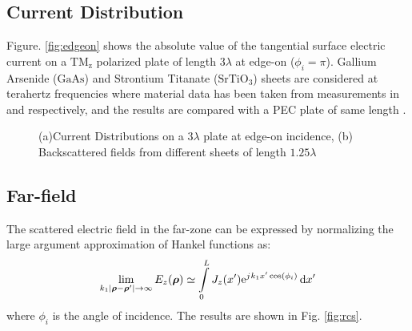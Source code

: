 \documentclass[12pt]{article}
\begin{document}
\subsection{Current Distribution}
%
Figure. \ref{fig:edgeon} shows the absolute value of the tangential surface electric current on a $\mathrm{TM_z}$ polarized plate of length $3 \lambda$ at edge-on ($\phi_i = \pi$). Gallium Arsenide ($\mathrm{GaAs}$) and Strontium Titanate ($\mathrm{SrTiO_3}$) sheets are considered at terahertz frequencies where material data has been taken from measurements in \cite{burke2000} and \cite{herranz2012high} respectively, and the results are compared with a PEC plate of same length \cite{senior1979backscattering}.
%
\begin{figure}[!htbp]
  \centering
  \caption{(a)Current Distributions on a $3\lambda$ plate at edge-on incidence, (b) Backscattered fields from different sheets of length $1.25\lambda$}
  \label{fig:Electric_properties_2DEG}
\end{figure}
%
\subsection{Far-field}
%
The scattered electric field in the far-zone can be expressed by normalizing the large argument approximation of Hankel functions as:
%
\begin{equation}
  \lim_{k_1|\boldsymbol {\rho} - \boldsymbol {\rho}'|\to\infty} E_z(\boldsymbol {\rho}) \simeq \int \limits_{0}^{L} J_z(x') \mathrm{e}^{{j}\mkern1mu k_1 x' \cos(\phi_i)} \mathop{}\!\mathrm{d}{x'}
  \label{eq:far-field}
\end{equation}
%
where $\phi_i$ is the angle of incidence. The results are shown in Fig. \ref{fig:rcs}.
%
\end{document}
